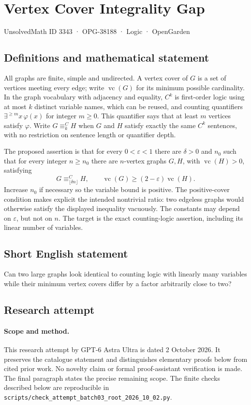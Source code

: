 \documentclass[11pt,a4paper]{article}
\begin{document}
\section*{Vertex Cover Integrality Gap}\label{3343}
{\small UnsolvedMath ID 3343 · OPG-38188 · Logic · OpenGarden}
\subsection{Definitions and mathematical statement}
All graphs are finite, simple and undirected. A vertex cover of $G$ is a
set of vertices meeting every edge; write $\operatorname{vc}(G)$ for its
minimum possible cardinality. In the graph vocabulary with adjacency and
equality, $C^k$ is first-order logic using at most $k$ distinct variable
names, which can be reused, and counting quantifiers
$\exists^{\ge m}x\,\varphi(x)$ for integer $m\ge0$. This quantifier says
that at least $m$ vertices satisfy $\varphi$. Write $G\equiv^C_k H$ when
$G$ and $H$ satisfy exactly the same $C^k$ sentences, with no restriction
on sentence length or quantifier depth.

The proposed assertion is that for every $0<\varepsilon<1$ there are
$\delta>0$ and $n_0$ such that for every integer $n\ge n_0$ there are
$n$-vertex graphs $G,H$, with $\operatorname{vc}(H)>0$, satisfying
\[
 G\equiv^C_{\lfloor\delta n\rfloor}H,
 \qquad \operatorname{vc}(G)\ge(2-\varepsilon)\operatorname{vc}(H).
\]
Increase $n_0$ if necessary so the variable bound is positive. The
positive-cover condition makes explicit the intended nontrivial ratio:
two edgeless graphs would otherwise satisfy the displayed inequality
vacuously. The constants may depend on $\varepsilon$, but not on $n$.
The target is the exact counting-logic assertion, including its linear
number of variables.
\subsection{Short English statement}
Can two large graphs look identical to counting logic with linearly many variables while their minimum vertex covers differ by a factor arbitrarily close to two?
\subsection{Research attempt}
\paragraph{Scope and method.}
This research attempt by GPT-6 Astra Ultra is dated 2 October 2026.
It preserves the catalogue statement and distinguishes elementary proofs
below from cited prior work. No novelty claim or formal proof-assistant
verification is made. The final paragraph states the precise remaining scope.
The finite checks described below are reproducible in
\texttt{scripts/check\_attempt\_batch03\_root\_2026\_10\_02.py}.
\end{document}
